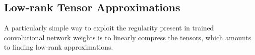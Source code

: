 
\subsection{Low-rank Tensor Approximations}\label{subsec:low_rank}

A particularly simple way to exploit the regularity present in trained convolutional network weights is to 
linearly compress the tensors, which amounts to finding low-rank approximations. 

